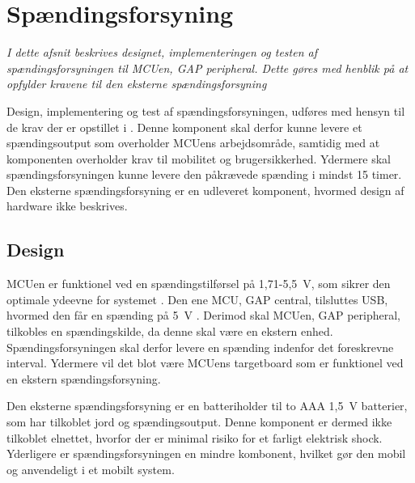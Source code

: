 \section{Spændingsforsyning}\label{spaendingsforsyning}
\textit{I dette afsnit beskrives designet, implementeringen og testen af spændingsforsyningen til MCUen, GAP peripheral. Dette gøres med henblik på at opfylder kravene til den eksterne spændingsforsyning}

Design, implementering og test af spændingsforsyningen, udføres med hensyn til de krav der er opstillet i . \newline
Denne komponent skal derfor kunne levere et spændingsoutput som overholder MCUens arbejdsområde, samtidig med at komponenten overholder krav til mobilitet og brugersikkerhed. Ydermere skal spændingsforsyningen kunne levere den påkrævede spænding i mindst 15 timer. \newline
Den eksterne spændingsforsyning er en udleveret komponent, hvormed design af hardware ikke beskrives. 


\subsection{Design}
MCUen er funktionel ved en spændingstilførsel på 1,71-5,5~V, som sikrer den optimale ydeevne for systemet \citep{Semiconductor20164200M,Semiconductor2016PRoC}. Den ene MCU, GAP central, tilsluttes USB, hvormed den får en spænding på 5~V \citep{Semiconductor2016}. Derimod skal MCUen, GAP peripheral, tilkobles en spændingskilde, da denne skal være en ekstern enhed. Spændingsforsyningen skal derfor levere en spænding indenfor det foreskrevne interval. Ydermere vil det blot være MCUens targetboard som er funktionel ved en ekstern spændingsforsyning.

Den eksterne spændingsforsyning er en batteriholder til to AAA 1,5~V batterier, som har tilkoblet jord og spændingsoutput. Denne komponent er dermed ikke tilkoblet elnettet, hvorfor der er minimal risiko for et farligt elektrisk shock. Yderligere er spændingsforsyningen en mindre kombonent, hvilket gør den mobil og anvendeligt i et mobilt system.

